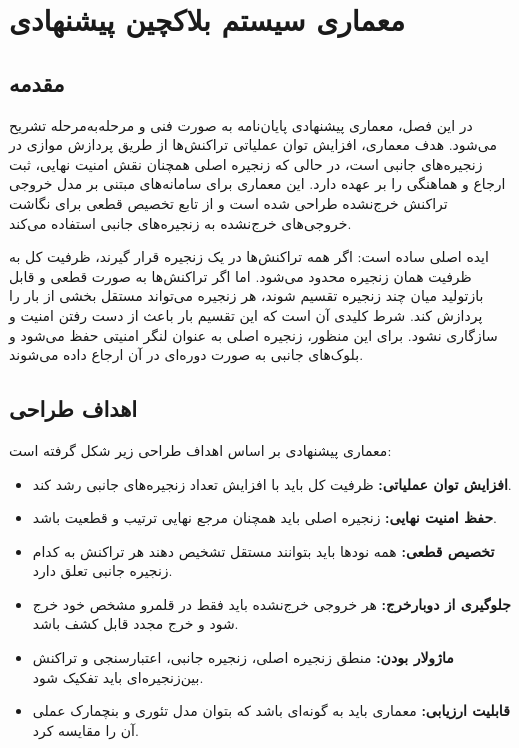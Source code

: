 \chapter{معماری سیستم بلاکچین پیشنهادی}
\section{مقدمه}

در این فصل، معماری پیشنهادی پایان‌نامه به صورت فنی و مرحله‌به‌مرحله تشریح می‌شود. هدف معماری، افزایش توان عملیاتی تراکنش‌ها از طریق پردازش موازی در زنجیره‌های جانبی است، در حالی که زنجیره اصلی همچنان نقش امنیت نهایی، ثبت ارجاع و هماهنگی را بر عهده دارد. این معماری برای سامانه‌های مبتنی بر مدل خروجی تراکنش خرج‌نشده طراحی شده است و از تابع تخصیص قطعی برای نگاشت خروجی‌های خرج‌نشده به زنجیره‌های جانبی استفاده می‌کند.

ایده اصلی ساده است: اگر همه تراکنش‌ها در یک زنجیره قرار گیرند، ظرفیت کل به ظرفیت همان زنجیره محدود می‌شود. اما اگر تراکنش‌ها به صورت قطعی و قابل بازتولید میان چند زنجیره تقسیم شوند، هر زنجیره می‌تواند مستقل بخشی از بار را پردازش کند. شرط کلیدی آن است که این تقسیم بار باعث از دست رفتن امنیت و سازگاری نشود. برای این منظور، زنجیره اصلی به عنوان لنگر امنیتی حفظ می‌شود و بلوک‌های جانبی به صورت دوره‌ای در آن ارجاع داده می‌شوند.

\section{اهداف طراحی}

معماری پیشنهادی بر اساس اهداف طراحی زیر شکل گرفته است:

\begin{itemize}
\item \textbf{افزایش توان عملیاتی:} ظرفیت کل باید با افزایش تعداد زنجیره‌های جانبی رشد کند.
\item \textbf{حفظ امنیت نهایی:} زنجیره اصلی باید همچنان مرجع نهایی ترتیب و قطعیت باشد.
\item \textbf{تخصیص قطعی:} همه نودها باید بتوانند مستقل تشخیص دهند هر تراکنش به کدام زنجیره جانبی تعلق دارد.
\item \textbf{جلوگیری از دوبارخرج:} هر خروجی خرج‌نشده باید فقط در قلمرو مشخص خود خرج شود و خرج مجدد قابل کشف باشد.
\item \textbf{ماژولار بودن:} منطق زنجیره اصلی، زنجیره جانبی، اعتبارسنجی و تراکنش بین‌زنجیره‌ای باید تفکیک شود.
\item \textbf{قابلیت ارزیابی:} معماری باید به گونه‌ای باشد که بتوان مدل تئوری و بنچمارک عملی آن را مقایسه کرد.
\end{itemize}

